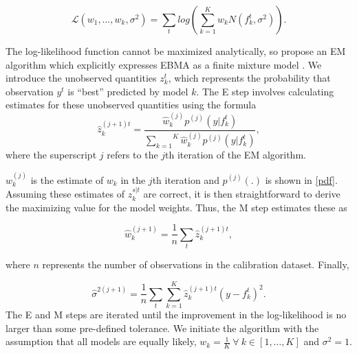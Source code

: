\documentclass[12pt,fullpage,endnotes]{article}
\begin{document}
\begin{equation}
\mathcal{L}(w_1, \ldots, w_k, \sigma^2)=\sum_tlog\left(\sum_{k=1}^Kw_kN(f^t_k, \sigma^2) \right).
\end{equation}


\noindent The log-likelihood function cannot be maximized analytically, so
\citet{Raftery:2005} propose an EM algorithm which explicitly
expresses EBMA as a finite mixture model \cite{mclachlan:peel:2000,imai:tingley:2012}.  We introduce the unobserved quantities
$z_k^t$, which represents the probability that observation $y^t$ is
``best'' predicted by model $k$.  The E step involves calculating
estimates for these unobserved quantities using the formula
\begin{equation}
\label{E-step}
\hat{z}^{(j+1)t}_{k} = \frac{\hat{w}^{(j)}_k
p^{(j)}(y|f_{k}^{t})}{\overset{K}{\underset{k=1}{\sum}}\hat{w}^{(j)}_kp^{(j)}(y|f_{k}^{t})},
\end{equation}
\noindent where the superscript $j$ refers to the $j$th iteration of
the EM algorithm.

$w_k^{(j)}$ is the estimate of $w_k$ in the $j$th iteration and
$p^{(j)}(.)$ is shown in \eqref{pdf}.  Assuming these estimates of
$z_{k}^{s|t}$ are correct, it is then straightforward to derive the
maximizing value for the model weights. Thus, the M step estimates
these as 

\begin{equation}
\label{M-step}
\hat{w}^{(j+1)}_k=\frac{1}{n}\underset{t}{\sum}\hat{z}^{(j+1)t}_{k},
\end{equation}

\noindent where $n$ represents the number of observations in the
calibration dataset.  Finally, %

\begin{equation}
\label{sigma}
\hat{\sigma}^{2(j+1)}=\frac{1}{n}\underset{t}{\sum}\overset{K}{\underset{k=1}{\sum}}\hat{z}^{(j+1)t}_{k}(y-f_{k}^{t})^2.
\end{equation}
\noindent The E and M steps are iterated until the improvement in the
log-likelihood is no larger than some pre-defined tolerance.  We
initiate the algorithm with the assumption that all models are equally
likely, $w_k = \frac{1}{K} ~ \forall ~ k \in [1, \ldots, K]$ and
$\sigma^2=1$.
\end{document}
